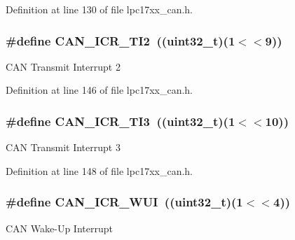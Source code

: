 \-Definition at line 130 of file lpc17xx\-\_\-can.\-h.

\hypertarget{group___c_a_n___private___macros_gad43c387e2fbc22cc95c3b3803e5e890f}{
\subsubsection[{\-C\-A\-N\-\_\-\-I\-C\-R\-\_\-\-T\-I2}]{\setlength{\rightskip}{0pt plus 5cm}\#define {\bf \-C\-A\-N\-\_\-\-I\-C\-R\-\_\-\-T\-I2}~((uint32\-\_\-t)(1$<$$<$9))}}\label{group___c_a_n___private___macros_gad43c387e2fbc22cc95c3b3803e5e890f}
\-C\-A\-N \-Transmit \-Interrupt 2 

\-Definition at line 146 of file lpc17xx\-\_\-can.\-h.

\hypertarget{group___c_a_n___private___macros_ga82d809099125ff45ae2f404eea9113a0}{
\subsubsection[{\-C\-A\-N\-\_\-\-I\-C\-R\-\_\-\-T\-I3}]{\setlength{\rightskip}{0pt plus 5cm}\#define {\bf \-C\-A\-N\-\_\-\-I\-C\-R\-\_\-\-T\-I3}~((uint32\-\_\-t)(1$<$$<$10))}}\label{group___c_a_n___private___macros_ga82d809099125ff45ae2f404eea9113a0}
\-C\-A\-N \-Transmit \-Interrupt 3 

\-Definition at line 148 of file lpc17xx\-\_\-can.\-h.

\hypertarget{group___c_a_n___private___macros_gaf0e24df45c2cc58b8b05c8475c0dbc0f}{
\subsubsection[{\-C\-A\-N\-\_\-\-I\-C\-R\-\_\-\-W\-U\-I}]{\setlength{\rightskip}{0pt plus 5cm}\#define {\bf \-C\-A\-N\-\_\-\-I\-C\-R\-\_\-\-W\-U\-I}~((uint32\-\_\-t)(1$<$$<$4))}}\label{group___c_a_n___private___macros_gaf0e24df45c2cc58b8b05c8475c0dbc0f}
\-C\-A\-N \-Wake-\/\-Up \-Interrupt 

